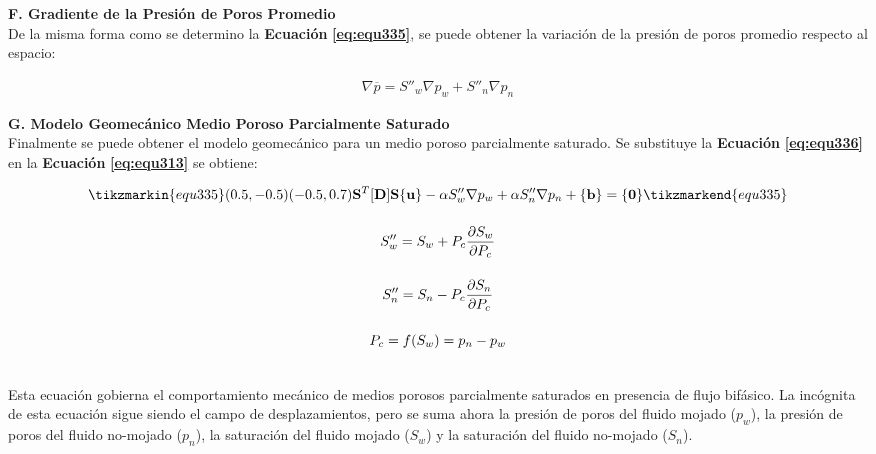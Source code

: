 \textbf{F. Gradiente de la Presión de Poros Promedio}
\\
De la misma forma como se determino la \textbf{Ecuación} \textbf{\ref{eq:equ335}}, se puede obtener la variación de la presión de poros promedio respecto al espacio:

\begin{ceqn} 
\begin{gather} \label{eq:equ336} 
\nabla \overline{p} = S''_w\nabla p_w + S''_n\nabla p_n
\end{gather}  
\end{ceqn}

\textbf{G. Modelo Geomecánico Medio Poroso Parcialmente Saturado}
\\
Finalmente se puede obtener el modelo geomecánico para un medio poroso parcialmente saturado. Se substituye la \textbf{Ecuación} \textbf{\ref{eq:equ336}} en la \textbf{Ecuación} \textbf{\ref{eq:equ313}} se obtiene:\bigskip


\begin{ceqn} 
\begin{subequations} \label{eq:equ337} 
\begin{gather}
\tikzmarkin{equ335}(0.5,-0.5)(-0.5,0.7)
\normalsize{\mathbf{S}^T[\mathbf{D}]\mathbf{S}\{\mathbf{u}\} - 
\alpha S''_w\nabla p_w + \alpha S''_n\nabla p_n + \{\mathbf{b}\} = \{\mathbf{0}\}}
\tikzmarkend{equ335}\label{eq:equ337a} \\[12pt]
S''_w = S_w + P_c\frac{\partial S_w}{\partial P_c}  \label{eq:equ337b} \\[12pt]
S''_n = S_n - P_c\frac{\partial S_n}{\partial P_c}  \label{eq:equ337c} \\[12pt]
P_c = \mathnormal{f}(S_w) = p_n - p_w  \label{eq:equ337d}
\end{gather}
\end{subequations} 
\end{ceqn}
\\
Esta ecuación gobierna el comportamiento mecánico de medios porosos parcialmente saturados en presencia de flujo bifásico. La incógnita de esta ecuación sigue siendo el campo de desplazamientos, pero se suma ahora la presión de poros del fluido mojado ($p_w$), la presión de poros del fluido no-mojado ($p_n$), la saturación del fluido mojado ($S_w$) y la saturación del fluido no-mojado ($S_n$).\bigskip\bigskip 

